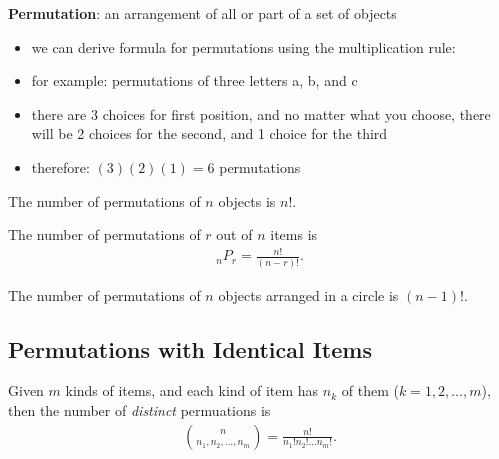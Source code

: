 \documentclass[10pt]{article}
\begin{document}
\begin{definition}
    \textbf{Permutation}: an arrangement of all or part of a set of objects
\end{definition}
\begin{itemize}
    \item we can derive formula for permutations using the multiplication rule:
    \item for example: permutations of three letters a, b, and c
    \item there are 3 choices for first position, and no matter what you choose, there will be 2 choices for the second, and 1 choice for the third
    \item therefore: $(3)(2)(1) = 6$ permutations
\end{itemize}
\begin{theorem}
    The number of permutations of $n$ objects is $n!$.    
\end{theorem}
\begin{theorem}
    The number of permutations of $r$ out of $n$ items is
    \begin{align*}
        _nP_r = \frac{n!}{(n-r)!}
    .\end{align*}
\end{theorem}
\begin{theorem}
    The number of permutations of $n$ objects arranged in a circle is $(n-1)!$.
\end{theorem}

\subsection{Permutations with Identical Items}
\begin{theorem}
    Given $m$ kinds of items, and each kind of item has $n_k$ of them ($k = 1, 2, \ldots, m$), then the number of \textit{distinct} permuations is
    \begin{align*}
        {n \choose n_1, n_2, \ldots, n_m} = \frac{n!}{n_1! n_2! \ldots n_m!}
    .\end{align*}
\end{theorem}
\end{document}
